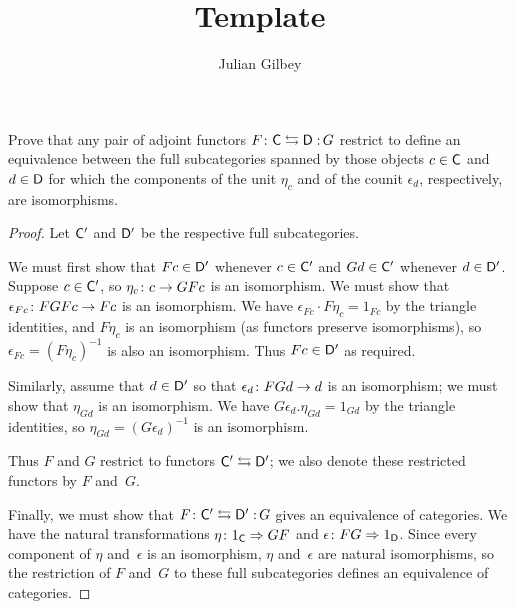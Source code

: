 \documentclass[../../solutions]{subfiles}
\title{Template}
\author{Julian Gilbey}
\begin{document}
\maketitle

%   

\begin{exercise}
  Prove that any pair of adjoint functors $\afunc{F}{G}{\sC}{\sD}$
  restrict to define an equivalence between the full subcategories
  spanned by those objects $c\in\mathsf{C}$ and $d\in\mathsf{D}$ for which the
  components of the unit $\eta_c$ and of the counit $\epsilon_d$,
  respectively, are isomorphisms.
\end{exercise}

\begin{proof}
  Let $\mathsf{C}'$ and $\mathsf{D}'$ be the respective full subcategories.

  We must first show that $Fc\in\mathsf{D}'$ whenever $c\in\mathsf{C}'$ and
  $Gd\in\mathsf{C}'$ whenever $d\in\mathsf{D}'$.  Suppose $c\in\mathsf{C}'$, so
  ${\eta_c}\colon{c}\to{GFc}$ is an isomorphism.  We must show that
  ${\epsilon_{Fc}}\colon{FGFc}\to{Fc}$ is an isomorphism.  We have
  $\epsilon_{Fc}\cdot F\eta_c=1_{Fc}$ by the triangle identities, and
  $F\eta_c$ is an isomorphism (as functors preserve isomorphisms), so
  $\epsilon_{Fc}=(F\eta_c)^{-1}$ is also an isomorphism.  Thus
  $Fc\in\mathsf{D}'$ as required.

  Similarly, assume that $d\in\mathsf{D}'$ so that
  ${\epsilon_d}\colon{FGd}\to{d}$ is an isomorphism; we must show that
  $\eta_{Gd}$ is an isomorphism.  We have
  $G\epsilon_d.\eta_{Gd}=1_{Gd}$ by the triangle identities, so
  $\eta_{Gd}=(G\epsilon_d)^{-1}$ is an isomorphism.

  Thus $F$ and $G$ restrict to functors $\mathsf{C}'\leftrightarrows\mathsf{D}'$; we
  also denote these restricted functors by $F$ and~$G$.

  Finally, we must show that $\afunc{F}{G}{\sC'}{\sD'}$ gives an
  equivalence of categories.  We have the natural transformations
  ${\eta}\colon{1_{\mathsf{C}}}\Rightarrow{GF}$ and ${\epsilon}\colon{FG}\Rightarrow{1_{\mathsf{D}}}$.  Since
  every component of $\eta$ and~$\epsilon$ is an isomorphism, $\eta$
  and~$\epsilon$ are natural isomorphisms, so the restriction of $F$
  and~$G$ to these full subcategories defines an equivalence of
  categories.
\end{proof}
\end{document}
